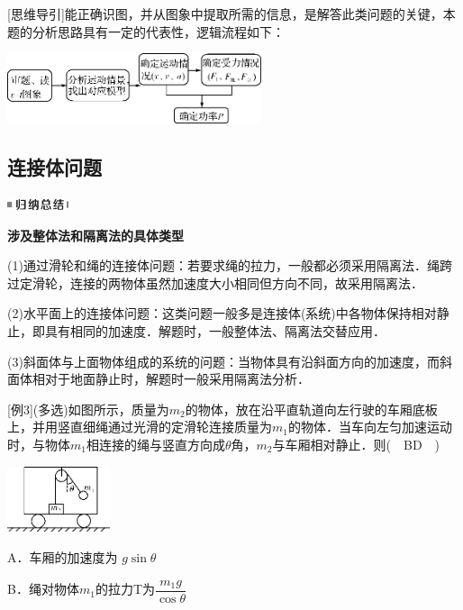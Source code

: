 \documentclass[cn,10.5pt,chinese,mac,chinesefont=founder]{elegantbook}
\begin{document}
{[}思维导引{]}能正确识图，并从图象中提取所需的信息，是解答此类问题的关键，本题的分析思路具有一定的代表性，逻辑流程如下：

\begin{center}\includegraphics[width=2.9375in,height=0.8125in]{media/image118.png}\end{center}
\newpage
\subsection{连接体问题}

\begin{center}\includegraphics[width=0.70833in,height=0.125in]{media/image13.png}

\textbf{涉及整体法和隔离法的具体类型}
\end{center}


(1)通过滑轮和绳的连接体问题：若要求绳的拉力，一般都必须采用隔离法．绳跨过定滑轮，连接的两物体虽然加速度大小相同但方向不同，故采用隔离法．

(2)水平面上的连接体问题：这类问题一般多是连接体(系统)中各物体保持相对静止，即具有相同的加速度．解题时，一般整体法、隔离法交替应用．

(3)斜面体与上面物体组成的系统的问题：当物体具有沿斜面方向的加速度，而斜面体相对于地面静止时，解题时一般采用隔离法分析．

{[}例3{]}(多选)如图所示，质量为$m_2$的物体，放在沿平直轨道向左行驶的车厢底板上，并用竖直细绳通过光滑的定滑轮连接质量为$m_1$的物体．当车向左匀加速运动时，与物体$m_1$相连接的绳与竖直方向成$\theta$角，$m_2$与车厢相对静止．则(　BD　)

\begin{center}\includegraphics[width=1.1875in,height=0.76042in]{media/image119.png}\end{center}

A．车厢的加速度为 $g\sin\theta$

B．绳对物体$m_1$的拉力T为$\dfrac{m_1g}{\cos\theta}$
\end{document}
